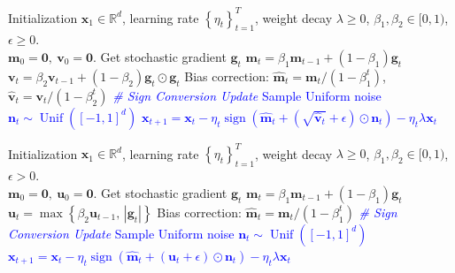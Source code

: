 \documentclass{article}
\def \x {\mathbf{x}}
\def \v {\mathbf{v}}
\def \g {\mathbf{g}}
\def \u {\mathbf{u}}
\def \R {\mathbb{R}}
\def \m {\mathbf{m}}
\def \n {\mathbf{n}}
\DeclareMathOperator*{\sgn}{sign}
\DeclareMathOperator*{\unif}{Unif}
\newcommand{\sign}[1]{\sgn\left(#1\right)}
\newcommand{\brac}[1]{\left(#1\right)}
\newcommand{\cbrac}[1]{\left\{#1\right\}}
\def\0{\bm{0}}
\begin{document}
\begin{algorithm}[htbp]
    \caption{SignAdamW}
    \label{alg:signadamw}
    \begin{algorithmic}[1]
     Initialization $\x_1\in\R^d$, learning rate $\cbrac{\eta_t}_{t=1}^T$, weight decay $\lambda\ge0$, $\beta_1,\beta_2\in[0,1)$, $\epsilon\ge0$.\\
     $\m_0=\0,\ \v_0=\0$.
        \STATE Get stochastic gradient $\g_t$
        \STATE $\m_t =\beta_1 \m_{t-1} + (1-\beta_1)\g_t$
        \STATE $\v_t =\beta_2 \v_{t-1} + (1-\beta_2)\g_t\odot\g_t$
        \STATE Bias correction: $\widehat{\m}_t = \m_t/(1-\beta_1^t)$, $\widehat{\v}_t = \v_t/(1-\beta_2^t)$
        \STATE \textcolor{blue}{\itshape \# Sign Conversion Update}
        \STATE \textcolor{blue}{Sample Uniform noise $\n_t\sim\unif\brac{[-1,1]^d}$}
        \STATE \textcolor{blue}{$\x_{t+1} = \x_t - \eta_t\sign{\widehat{\m}_t +\brac{\sqrt{\widehat{\v}_t}+\epsilon}\odot \n_t} - \eta_t\lambda\x_t$}
    \ENDFOR
\end{algorithmic}
\end{algorithm}

\begin{algorithm}[htbp]
    \caption{SignAdaMax}
    \label{alg:signadamax}
    \begin{algorithmic}[1]
     Initialization $\x_1\in\R^d$, learning rate $\cbrac{\eta_t}_{t=1}^T$, weight decay $\lambda\ge0$, $\beta_1,\beta_2\in[0,1)$, $\epsilon>0$.\\
     $\m_0=\0,\ \u_0=\0$.
        \STATE Get stochastic gradient $\g_t$
        \STATE $\m_t = \beta_1 \m_{t-1} + (1-\beta_1)\g_t$
        \STATE $\u_t = \max\cbrac{\beta_2 \u_{t-1},\, |\g_t|}$ 
        \STATE Bias correction: $\widehat{\m}_t = \m_t/(1-\beta_1^t)$
        \STATE \textcolor{blue}{\itshape \# Sign Conversion Update}
        \STATE \textcolor{blue}{Sample Uniform noise $\n_t\sim\unif\brac{[-1,1]^d}$}
        \STATE \textcolor{blue}{$\x_{t+1} = \x_t - \eta_t\sign{\widehat{\m}_t +\brac{\u_t+\epsilon}\odot \n_t} - \eta_t\lambda\x_t$}
    \ENDFOR
\end{algorithmic}
\end{algorithm}
\end{document}
